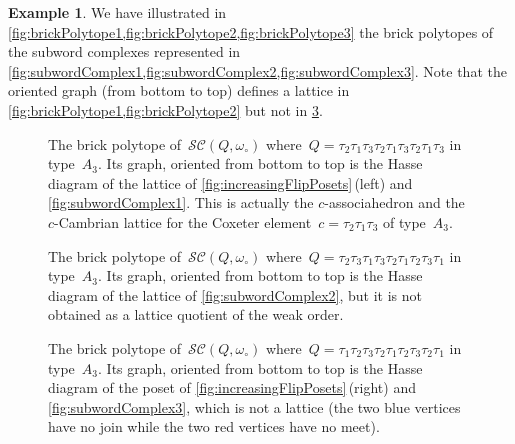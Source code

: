 \documentclass[reqno]{amsart}
\theoremstyle{definition}
\newtheorem{example}[theorem]{Example}
\newcommand{\wo}{\omega_\circ} %
\newcommand{\subwordComplex}{\mathcal{SC}} %
\begin{document}
\begin{example}
We have illustrated in \cref{fig:brickPolytope1,fig:brickPolytope2,fig:brickPolytope3} the brick polytopes of the subword complexes represented in \cref{fig:subwordComplex1,fig:subwordComplex2,fig:subwordComplex3}.
Note that the oriented graph (from bottom to top) defines a lattice in \cref{fig:brickPolytope1,fig:brickPolytope2} but not in \cref{fig:brickPolytope3}.
%
\begin{figure}[p]
	\centerline{}
	\caption{The brick polytope of~$\subwordComplex(Q,\wo)$ where~$Q = \tau_2 \tau_1 \tau_3 \tau_2 \tau_1 \tau_3 \tau_2 \tau_1 \tau_3$ in type~$A_3$. Its graph, oriented from bottom to top is the Hasse diagram of the lattice of \cref{fig:increasingFlipPosets}\,(left) and \cref{fig:subwordComplex1}. This is actually the $c$-associahedron and the $c$-Cambrian lattice for the Coxeter element~$c = \tau_2\tau_1\tau_3$ of type~$A_3$.}
	\label{fig:brickPolytope1}
\end{figure}
%
\begin{figure}[p]
	\centerline{}
	\caption{The brick polytope of~$\subwordComplex(Q,\wo)$ where~$Q = \tau_2 \tau_3 \tau_1 \tau_3 \tau_2 \tau_1 \tau_2 \tau_3 \tau_1$ in type~$A_3$. Its graph, oriented from bottom to top is the Hasse diagram of the lattice of \cref{fig:subwordComplex2}, but it is not obtained as a lattice quotient of the weak order.}
	\label{fig:brickPolytope2}
\end{figure}
%
\begin{figure}[p]
	\centerline{}
	\caption{The brick polytope of~$\subwordComplex(Q,\wo)$ where~$Q = \tau_1 \tau_2 \tau_3 \tau_2 \tau_1 \tau_2 \tau_3 \tau_2 \tau_1$ in type~$A_3$. Its graph, oriented from bottom to top is the Hasse diagram of the poset of \cref{fig:increasingFlipPosets}\,(right) and \cref{fig:subwordComplex3}, which is not a lattice (the two blue vertices have no join while the two red vertices have no meet).}
	\label{fig:brickPolytope3}
\end{figure}
\end{example}

\end{document}
